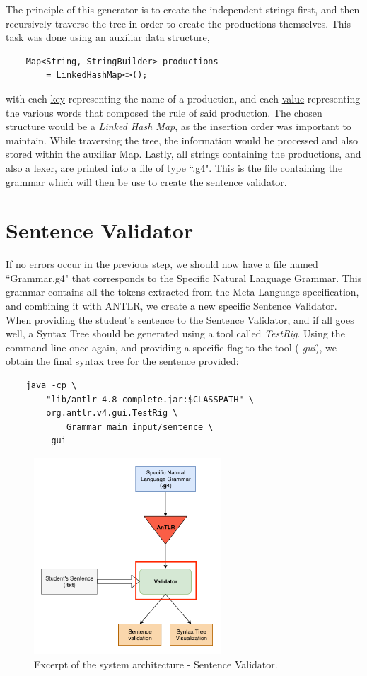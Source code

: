 The principle of this generator is to create the independent strings first, and then recursively traverse the tree in order to create the productions themselves.
This task was done using an auxiliar data structure,
\begin{Verbatim}
	Map<String, StringBuilder> productions 
		= LinkedHashMap<>();
\end{Verbatim}
\noindent with each \underline{key} representing the name of a production, and each \underline{value} representing the various words that composed the rule of said production.
The chosen structure would be a \emph{Linked Hash Map}, as the insertion order was important to maintain.
While traversing the tree, the information would be processed and also stored within the auxiliar Map.
Lastly, all strings containing the productions, and also a lexer, are printed into a file of type ``.g4". 
This is the file containing the grammar which will then be use to create the sentence validator.

\newpage
\section{Sentence Validator}

If no errors occur in the previous step, we should now have a file named ``Grammar.g4" that corresponds to the Specific Natural Language Grammar.
This grammar contains all the tokens extracted from the Meta-Language specification, and combining it with ANTLR, we create a new specific Sentence Validator.
When providing the student's sentence to the Sentence Validator, and if all goes well, a Syntax Tree should be generated using a tool called \emph{TestRig}.
Using the command line once again, and providing a specific flag to the tool (\emph{-gui}), we obtain the final syntax tree for the sentence provided: 
\begin{Verbatim}
	java -cp \ 
		"lib/antlr-4.8-complete.jar:$CLASSPATH" \ 
		org.antlr.v4.gui.TestRig \ 
			Grammar main input/sentence \ 
		-gui
\end{Verbatim}

\begin{figure}[h]
    \centering
    \includegraphics[width=7cm]{images/system_sentence_validator.png}
    \caption{Excerpt of the system architecture - Sentence Validator.}
    \label{fig:systemSentenceValidator}
\end{figure}

